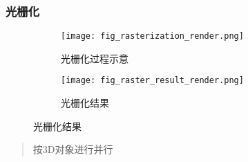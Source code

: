 \begin{frame}
    \frametitle{光栅化}
    \begin{figure}[ht!]
        \centering
        \begin{subfigure}{0.48\textwidth}
            \centering
            \texttt{[image: fig\_rasterization\_render.png]}
            \caption{光栅化过程示意}
        \end{subfigure}
        \begin{subfigure}{0.48\textwidth}
            \texttt{[image: fig\_raster\_result\_render.png]}
            \caption{光栅化结果}
        \end{subfigure}
    \end{figure}
    \begin{quote}
        按3D对象进行并行
    \end{quote}
\end{frame}
